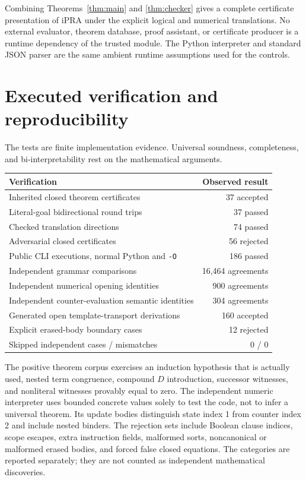Combining Theorems~\ref{thm:main} and \ref{thm:checker} gives a complete
certificate presentation of iPRA under the explicit logical and numerical
translations. No external evaluator, theorem database, proof assistant,
or certificate producer is a runtime dependency of the trusted module.
The Python interpreter and standard JSON parser are the same ambient
runtime assumptions used for the controls.

\section{Executed verification and reproducibility}\label{sec:verification}

The tests are finite implementation evidence. Universal soundness,
completeness, and bi-interpretability rest on the mathematical arguments.

\begin{center}
\small
\begin{tabular}{@{}lr@{}}
\toprule
Verification & Observed result\\
\midrule
Inherited closed theorem certificates & 37 accepted\\
Literal-goal bidirectional round trips & 37 passed\\
Checked translation directions & 74 passed\\
Adversarial closed certificates & 56 rejected\\
Public CLI executions, normal Python and \texttt{-O} & 186 passed\\
Independent grammar comparisons & 16,464 agreements\\
Independent numerical opening identities & 900 agreements\\
Independent counter-evaluation semantic identities & 304 agreements\\
Generated open template-transport derivations & 160 accepted\\
Explicit erased-body boundary cases & 12 rejected\\
Skipped independent cases / mismatches & 0 / 0\\
\bottomrule
\end{tabular}
\end{center}

The positive theorem corpus exercises an induction hypothesis that is
actually used, nested term congruence, compound $D$ introduction, successor
witnesses, and nonliteral witnesses provably equal to zero. The independent
numeric interpreter uses bounded concrete values solely to test the code,
not to infer a universal theorem. Its update bodies distinguish state
index 1 from counter index 2 and include nested binders. The rejection
sets include Boolean clause indices, scope escapes, extra instruction
fields, malformed sorts, noncanonical or malformed erased bodies, and
forced false closed equations. The categories are reported separately;
they are not counted as independent mathematical discoveries.

